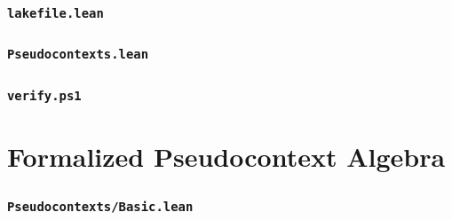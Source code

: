 \documentclass{article}
\begin{document}
\subsubsection*{\texttt{lakefile.lean}}


\subsubsection*{\texttt{Pseudocontexts.lean}}


\subsubsection*{\texttt{verify.ps1}}


\newpage
\section{Formalized Pseudocontext Algebra}
\label{app:lean-basic}

\subsubsection*{\texttt{Pseudocontexts/Basic.lean}}

\end{document}
